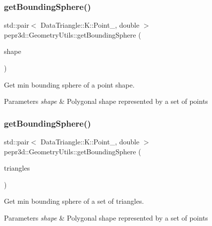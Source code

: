\subsubsection{\texorpdfstring{getBoundingSphere()}{getBoundingSphere()}\hspace{0.1cm}{\footnotesize\ttfamily [1/3]}}
{\footnotesize\ttfamily std\+::pair$<$ Data\+Triangle\+::\+K\+::\+Point\+\_, double $>$ pepr3d\+::\+Geometry\+Utils\+::get\+Bounding\+Sphere (\begin{DoxyParamCaption}\item[{const std\+::vector$<$ Data\+Triangle\+::\+K\+::\+Point\+\_\+3 $>$ \&}]{shape }\end{DoxyParamCaption})\hspace{0.3cm}{\ttfamily [static]}}



Get min bounding sphere of a point shape. 


\begin{DoxyParams}{Parameters}
{\em shape} & Polygonal shape represented by a set of points \\
\hline
\end{DoxyParams}
\mbox{\label{classpepr3d_1_1_geometry_utils_a89cc912fcdca2c33502aa050841d660e}} 
\subsubsection{\texorpdfstring{getBoundingSphere()}{getBoundingSphere()}\hspace{0.1cm}{\footnotesize\ttfamily [2/3]}}
{\footnotesize\ttfamily std\+::pair$<$ Data\+Triangle\+::\+K\+::\+Point\+\_, double $>$ pepr3d\+::\+Geometry\+Utils\+::get\+Bounding\+Sphere (\begin{DoxyParamCaption}\item[{const std\+::vector$<$ Data\+Triangle\+::\+Triangle $>$ \&}]{triangles }\end{DoxyParamCaption})\hspace{0.3cm}{\ttfamily [static]}}



Get min bounding sphere of a set of triangles. 


\begin{DoxyParams}{Parameters}
{\em shape} & Polygonal shape represented by a set of points \\
\hline
\end{DoxyParams}
\mbox{\label{classpepr3d_1_1_geometry_utils_a8a4bbf6d68fa3474b7ae286d584ebe94}} 
